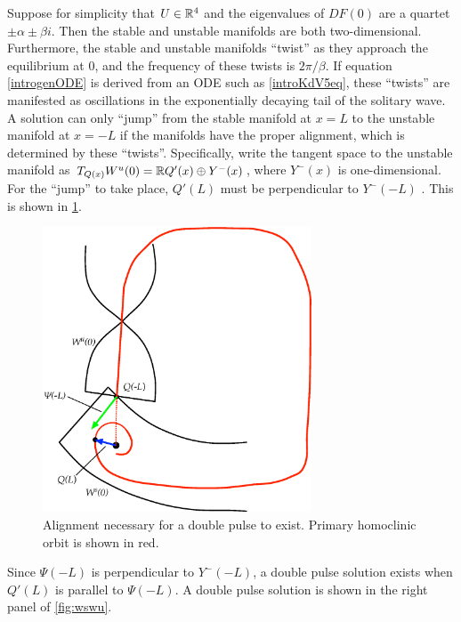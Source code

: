 \documentclass[thesis.tex]{subfiles}
\begin{document}
Suppose for simplicity that $U \in \mathbb{R}^4$ and the eigenvalues of $DF(0)$ are a quartet $\pm \alpha \pm \beta i$. Then the stable and unstable manifolds are both two-dimensional. Furthermore, the stable and unstable manifolds ``twist'' as they approach the equilibrium at 0, and the frequency of these twists is $2 \pi / \beta$. If equation \cref{introgenODE} is derived from an ODE such as \cref{introKdV5eq}, these ``twists'' are manifested as oscillations in the exponentially decaying tail of the solitary wave. A solution can only ``jump'' from the stable manifold at $x = L$ to the unstable manifold at $x = -L$ if the manifolds have the proper alignment, which is determined by these ``twists''. Specifically, write the tangent space to the unstable manifold as $T_{Q(x)}W^u(0) = \mathbb{R} Q'(x) \oplus Y^-(x)$, where $Y^-(x)$ is one-dimensional. For the ``jump'' to take place, $Q'(L)$ must be perpendicular to $Y^-(-L)$ \cite{Sandstede1993,Sandstede2002}. This is shown in \cref{fig:manifoldslineup}.
\begin{figure}
\begin{center}
\includegraphics[width=8cm]{images/intro/manifoldslineup}
\caption{Alignment necessary for a double pulse to exist. Primary homoclinic orbit is shown in red.}
\label{fig:manifoldslineup}
\end{center}
\end{figure}
Since $\Psi(-L)$ is perpendicular to $Y^-(-L)$, a double pulse solution exists when $Q'(L)$ is parallel to $\Psi(-L)$. A double pulse solution is shown in the right panel of \cref{fig:wswu}. 
\end{document}
